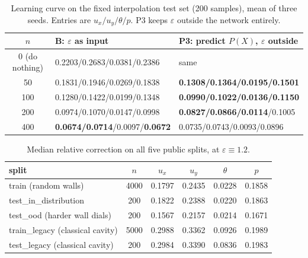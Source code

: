 \documentclass[preprint,11pt,a4paper,times]{elsarticle}
\begin{document}
\begin{table}[htbp]
\centering
\footnotesize
\setlength{\tabcolsep}{4pt}
\caption{Learning curve on the fixed interpolation test set (200 samples), mean of three seeds.
Entries are $u_x/u_y/\theta/p$. P3 keeps $\varepsilon$ outside the network entirely.}
\label{tab:learning}
\begin{tabular}{@{}c p{5.0cm}p{5.0cm}@{}}
\toprule
$n$ & B: $\varepsilon$ as input & P3: predict $P(X)$, $\varepsilon$ outside\\
\midrule
0 (do nothing) & 0.2203/0.2683/0.0381/0.2386 & same\\
50 & 0.1831/0.1946/0.0269/0.1838 & \textbf{0.1308/0.1364/0.0195/0.1501}\\
100 & 0.1280/0.1422/0.0199/0.1348 & \textbf{0.0990/0.1022/0.0136/0.1150}\\
200 & 0.0974/0.1070/0.0147/0.0998 & \textbf{0.0827/0.0866/0.0114}/0.1005\\
400 & \textbf{0.0674/0.0714}/0.0097/\textbf{0.0672} & 0.0735/0.0743/0.0093/0.0896\\
\bottomrule
\end{tabular}
\end{table}

\begin{table}[htbp]
\centering
\small
\caption{Median relative correction on all five public splits, at $\varepsilon\equiv1.2$.}
\label{tab:splits}
\begin{tabular}{@{}lccccc@{}}
\toprule
split & $n$ & $u_x$ & $u_y$ & $\theta$ & $p$\\
\midrule
train (random walls) & 4000 & 0.1797 & 0.2435 & 0.0228 & 0.1858\\
test\_in\_distribution & 200 & 0.1822 & 0.2388 & 0.0220 & 0.1863\\
test\_ood (harder wall dials) & 200 & 0.1567 & 0.2157 & 0.0214 & 0.1671\\
train\_legacy (classical cavity) & 5000 & 0.2988 & 0.3362 & 0.0926 & 0.1989\\
test\_legacy (classical cavity) & 200 & 0.2984 & 0.3390 & 0.0836 & 0.1983\\
\bottomrule
\end{tabular}
\end{table}
\end{document}
